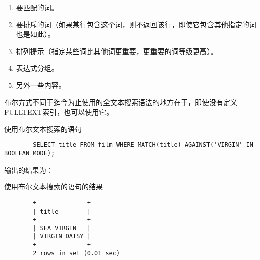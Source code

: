 \documentclass[UTF8]{article}
\begin{document}
\begin{orangebox}[frametitle={Tips 18.4.1 布尔文本搜索可以提供的细节}]
        \begin{enumerate}
                \item 要匹配的词。
                \item 要排斥的词（如果某行包含这个词，则不返回该行，即使它包含其他指定的词也是如此）。
                \item 排列提示（指定某些词比其他词更重要，更重要的词等级更高）。
                \item 表达式分组。
                \item 另外一些内容。
        \end{enumerate}
\end{orangebox}  

\begin{orangebox}[frametitle={Tips 18.4.2 没有FULLTEXT索引也可以使用}]
        布尔方式不同于迄今为止使用的全文本搜索语法的地方在于，即使没有定义FULLTEXT索引，也可以使用它。
\end{orangebox} 
        
\begin{listing}[H]
        \caption{使用布尔文本搜索的语句}
	\label{code:usebooleanmodeclause}
\begin{verbatim}
        SELECT title FROM film WHERE MATCH(title) AGAINST('VIRGIN' IN BOOLEAN MODE);
\end{verbatim}
\end{listing}


输出的结果为：

\begin{listing}[H]
	\caption{使用布尔文本搜索的语句的结果}
	\label{code:usebooleanmodeclauseresult}
\begin{verbatim}
        +--------------+
        | title        |
        +--------------+
        | SEA VIRGIN   |
        | VIRGIN DAISY |
        +--------------+
        2 rows in set (0.01 sec)
\end{verbatim}
\end{listing}
\end{document}
